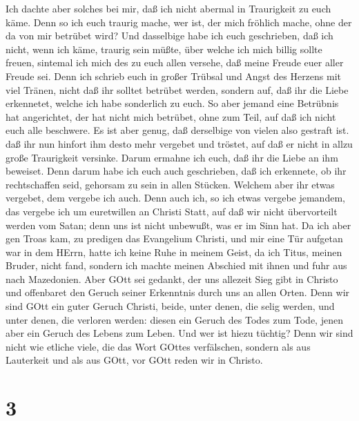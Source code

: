  Ich dachte aber solches bei mir, daß ich nicht abermal in
Traurigkeit zu euch käme.  Denn so ich euch traurig mache,
wer ist, der mich fröhlich mache, ohne der da von mir betrübet wird?
 Und dasselbige habe ich euch geschrieben, daß ich nicht,
wenn ich käme, traurig sein müßte, über welche ich mich billig sollte
freuen, sintemal ich mich des zu euch allen versehe, daß meine Freude
euer aller Freude sei.  Denn ich schrieb euch in großer
Trübsal und Angst des Herzens mit viel Tränen, nicht daß ihr solltet
betrübet werden, sondern auf, daß ihr die Liebe erkennetet, welche ich
habe sonderlich zu euch.  So aber jemand eine Betrübnis hat
angerichtet, der hat nicht mich betrübet, ohne zum Teil, auf daß ich
nicht euch alle beschwere.  Es ist aber genug, daß
derselbige von vielen also gestraft ist.  daß ihr nun
hinfort ihm desto mehr vergebet und tröstet, auf daß er nicht in allzu
große Traurigkeit versinke.  Darum ermahne ich euch, daß ihr
die Liebe an ihm beweiset.  Denn darum habe ich euch auch
geschrieben, daß ich erkennete, ob ihr rechtschaffen seid, gehorsam zu
sein in allen Stücken.  Welchem aber ihr etwas vergebet,
dem vergebe ich auch. Denn auch ich, so ich etwas vergebe jemandem, das
vergebe ich um euretwillen an Christi Statt,  auf daß wir
nicht übervorteilt werden vom Satan; denn uns ist nicht unbewußt, was er
im Sinn hat.  Da ich aber gen Troas kam, zu predigen das
Evangelium Christi, und mir eine Tür aufgetan war in dem HErrn,
 hatte ich keine Ruhe in meinem Geist, da ich Titus, meinen
Bruder, nicht fand, sondern ich machte meinen Abschied mit ihnen und
fuhr aus nach Mazedonien.  Aber GOtt sei gedankt, der uns
allezeit Sieg gibt in Christo und offenbaret den Geruch seiner
Erkenntnis durch uns an allen Orten.  Denn wir sind GOtt
ein guter Geruch Christi, beide, unter denen, die selig werden, und
unter denen, die verloren werden:  diesen ein Geruch des
Todes zum Tode, jenen aber ein Geruch des Lebens zum Leben. Und wer ist
hiezu tüchtig?  Denn wir sind nicht wie etliche viele, die
das Wort GOttes verfälschen, sondern als aus Lauterkeit und als aus
GOtt, vor GOtt reden wir in Christo.

\hypertarget{section-2}{%
\section{3}\label{section-2}}

